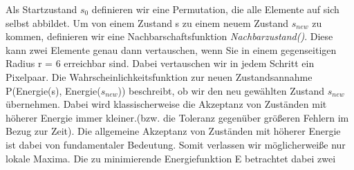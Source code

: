 Als Startzustand $s_{0}$ definieren wir eine Permutation, die alle 
Elemente auf sich selbst abbildet.
Um von einem Zustand s zu einem neuem Zustand $s_{new}$ zu kommen,
definieren wir eine Nachbarschaftsfunktion \textit{Nachbarzustand()}. 
Diese kann zwei Elemente genau dann vertauschen, wenn Sie in einem 
gegenseitigen Radius r = 6 erreichbar sind. Dabei vertauschen wir
in jedem Schritt ein Pixelpaar. 
Die Wahrscheinlichkeitsfunktion zur neuen Zustandsannahme
P(Energie(s), Energie($s_{new}$)) beschreibt, ob wir den neu
gewählten Zustand $s_{new}$ übernehmen. Dabei wird klassischerweise die
Akzeptanz von Zuständen mit höherer Energie immer kleiner.(bzw. die 
Toleranz gegenüber größeren Fehlern im Bezug zur Zeit). Die allgemeine Akzeptanz von 
Zuständen mit höherer Energie ist dabei von fundamentaler Bedeutung.
Somit verlassen wir möglicherweiße nur lokale Maxima.
Die zu minimierende Energiefunktion E betrachtet
dabei zwei 

